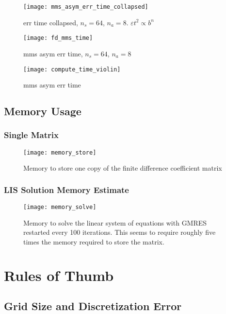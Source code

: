 \begin{figure}[H]
  \centering
  \texttt{[image: mms\_asym\_err\_time\_collapsed]}
  \caption{err time collapsed, $n_s=64$, $n_a=8$. $\varepsilon t^2 \propto b^n$}
  \label{fig:mms_asym_err_time_collapsed}
\end{figure}

\begin{figure}[H]
  \centering
  \texttt{[image: fd\_mms\_time]}
  \caption{mms asym err time, $n_s=64$, $n_a=8$}
  \label{fig:fd_mms_time}
\end{figure}

\begin{figure}[H]
  \centering
  \texttt{[image: compute\_time\_violin]}
  \caption{mms asym err time}
  \label{fig:compute_time_violin}
\end{figure}

\subsection{Memory Usage}
\subsubsection{Single Matrix}
\begin{figure}[H]
  \centering
  \texttt{[image: memory\_store]}
  \caption{Memory to store one copy of the finite difference coefficient matrix}
  \label{fig:memory_store}
\end{figure}

\subsubsection{LIS Solution Memory Estimate}
\begin{figure}[H]
  \centering
  \texttt{[image: memory\_solve]}
  \caption{Memory to solve the linear system of equations with GMRES restarted every 100 iterations. This seems to require roughly five times the memory required to store the matrix.}
  \label{fig:memory_solve}
\end{figure}


\section{Rules of Thumb}
\subsection{Grid Size and Discretization Error}
